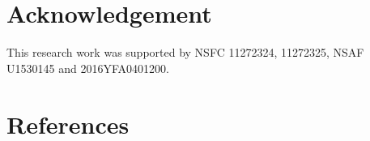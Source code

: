 \documentclass[review]{elsarticle}
\theoremstyle{plain}\newtheorem{definition}{\sc{Definition}}
\theoremstyle{defination}\newtheorem{example}{Example}[section]
\numberwithin{equation}{section}
\numberwithin{table}{section}
\begin{document}

\section*{Acknowledgement} 
This research work was supported by NSFC 11272324, 11272325, NSAF U1530145 and 2016YFA0401200.

\section*{References}


\end{document}
